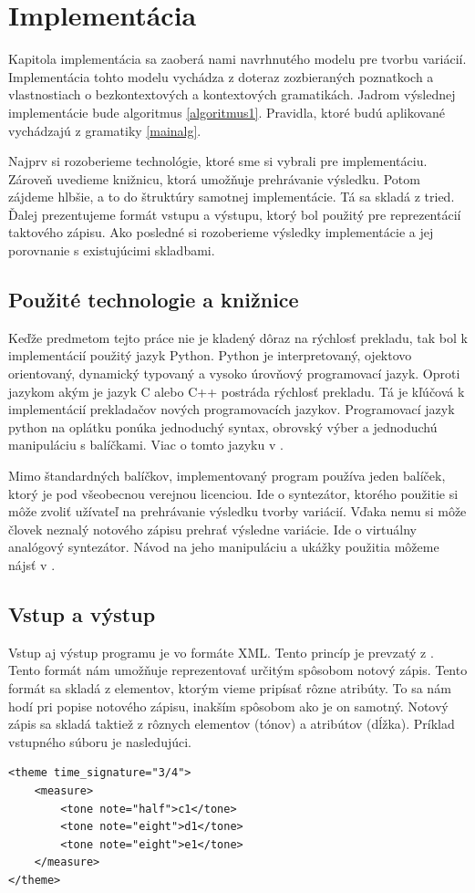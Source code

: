 \chapter{Implementácia}
\label{chap:imp}
Kapitola implementácia sa zaoberá nami navrhnutého modelu pre tvorbu variácií. Implementácia tohto modelu vychádza z doteraz zozbieraných poznatkoch a vlastnostiach o bezkontextových a kontextových gramatikách. Jadrom výslednej implementácie bude algoritmus \ref{algoritmus1}. Pravidla, ktoré budú aplikované vychádzajú z gramatiky \ref{mainalg}.

Najprv si rozoberieme technológie, ktoré sme si vybrali pre implementáciu. Zároveň uvedieme knižnicu, ktorá umožňuje prehrávanie výsledku. Potom zájdeme hlbšie, a to do štruktúry samotnej implementácie. Tá sa skladá z tried. Ďalej prezentujeme formát vstupu a výstupu, ktorý bol použitý pre reprezentácií taktového zápisu. Ako posledné si rozoberieme výsledky implementácie a jej porovnanie s existujúcimi skladbami.

\section{Použité technologie a knižnice}
Keďže predmetom tejto práce nie je kladený dôraz na rýchlosť prekladu, tak bol k implementácií použitý jazyk Python. Python je interpretovaný, ojektovo orientovaný, dynamický typovaný a vysoko úrovňový programovací jazyk. Oproti jazykom akým je jazyk C alebo C++ postráda rýchlosť prekladu. Tá je kľúčová k implementácií prekladačov nových programovacích jazykov. Programovací jazyk python na oplátku ponúka jednoduchý syntax, obrovský výber a jednoduchú manipuláciu s balíčkami. Viac o tomto jazyku v \cite{python:site}.

Mimo štandardných balíčkov, implementovaný program používa jeden balíček, ktorý je pod všeobecnou verejnou licenciou. Ide o syntezátor, ktorého použitie si môže zvoliť užívateľ na prehrávanie výsledku tvorby variácií. Vďaka nemu si môže človek neznalý notového zápisu prehrať výsledne variácie. Ide o virtuálny analógový syntezátor. Návod na jeho manipuláciu a ukážky použitia môžeme nájsť v \cite{synt:site}.

\section{Vstup a výstup}
\label{inputoutput}
Vstup aj výstup programu je vo formáte XML. Tento princíp je prevzatý z \cite{afrpub}. Tento formát nám umožňuje reprezentovať určitým spôsobom notový zápis. Tento formát sa skladá z elementov, ktorým vieme pripísať rôzne atribúty. To sa nám hodí pri popise notového zápisu, inakším spôsobom ako je on samotný. Notový zápis sa skladá taktiež z rôznych elementov (tónov) a atribútov (dĺžka). Príklad vstupného súboru je nasledujúci.
\lstset{language=XML}
\begin{lstlisting}
<theme time_signature="3/4">
    <measure>
        <tone note="half">c1</tone>
        <tone note="eight">d1</tone>
        <tone note="eight">e1</tone>
    </measure>
</theme>
\end{lstlisting}

